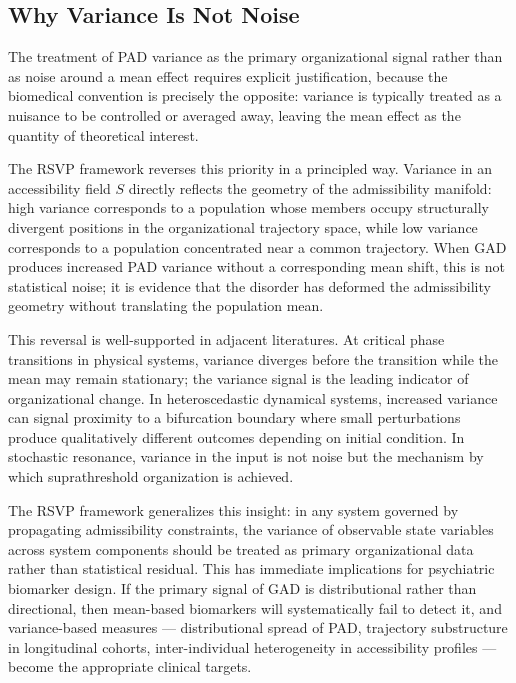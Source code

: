 \documentclass[11pt,a4paper]{article}
\theoremstyle{plain}
\theoremstyle{definition}
\begin{document}
\subsection{Why Variance Is Not Noise}

The treatment of PAD variance as the primary organizational signal rather than as
noise around a mean effect requires explicit justification, because the biomedical
convention is precisely the opposite: variance is typically treated as a nuisance
to be controlled or averaged away, leaving the mean effect as the quantity of
theoretical interest.

The RSVP framework reverses this priority in a principled way. Variance in an
accessibility field $S$ directly reflects the geometry of the admissibility manifold:
high variance corresponds to a population whose members occupy structurally divergent
positions in the organizational trajectory space, while low variance corresponds to
a population concentrated near a common trajectory. When GAD produces increased PAD
variance without a corresponding mean shift, this is not statistical noise; it is
evidence that the disorder has deformed the admissibility geometry without translating
the population mean.

This reversal is well-supported in adjacent literatures. At critical phase transitions
in physical systems, variance diverges before the transition while the mean may remain
stationary; the variance signal is the leading indicator of organizational change.
In heteroscedastic dynamical systems, increased variance can signal proximity to a
bifurcation boundary where small perturbations produce qualitatively different
outcomes depending on initial condition. In stochastic resonance, variance in the
input is not noise but the mechanism by which suprathreshold organization is achieved.

The RSVP framework generalizes this insight: in any system governed by propagating
admissibility constraints, the variance of observable state variables across system
components should be treated as primary organizational data rather than statistical
residual. This has immediate implications for psychiatric biomarker design. If the
primary signal of GAD is distributional rather than directional, then mean-based
biomarkers will systematically fail to detect it, and variance-based measures ---
distributional spread of PAD, trajectory substructure in longitudinal cohorts,
inter-individual heterogeneity in accessibility profiles --- become the appropriate
clinical targets.
\end{document}
